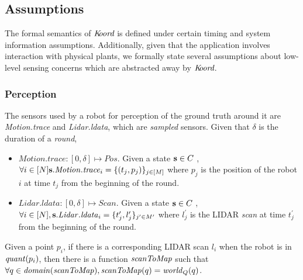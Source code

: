\subsection{Assumptions}
\label{sec:formal:sensing}

The formal semantics of $\emph{K\kern-2pt oord}$ is defined under certain timing and system information assumptions. Additionally, given that the application involves interaction with physical plants, we formally state several assumptions about low-level sensing concerns which are abstracted away by $\emph{K\kern-2pt oord}$.

\subsubsection{Perception}





The sensors used by a robot for perception of the ground truth around it are \emph{Motion.trace} and \emph{Lidar.ldata}, which are \emph{sampled} sensors. Given that $\delta$ is the duration of a \emph{round},

\begin{itemize}
    \item $\mathit{Motion.trace}: [0,\delta] \mapsto \mathit{Pos}$. Given a state ${\textbf{s}}\in C$ ,  $\forall i \in [N]{\textbf{s}}.\mathit{Motion.trace}_i = \{(t_j, p_j)\}_{j \in [M]}$ where $p_j$ is the position of the robot $i$ at time $t_j$ from the beginning of the round.
    \item  $\mathit{Lidar.ldata} : [0,\delta]\mapsto \mathit{Scan}$. Given a state ${\textbf{s}}\in C$ , $\forall i \in [N], {\textbf{s}}.\mathit{Lidar.ldata}_i = \{t_j^\prime, l_j^\prime\}_{j^\prime \in M^\prime}$ where $l_j^\prime$ is the LIDAR \emph{scan} at time $t_j^\prime$ from the beginning of the round.
\end{itemize}

\begin{assumption}
    \label{maptoscan}
    Given a point $p_i$, if there is a corresponding LIDAR scan $l_i$ when the robot is in $\mathit{quant}(p_i)$, then there is a function $\mathit{scanToMap}$ such that $\forall q \in \mathit{domain}(\mathit{scanToMap}), \mathit{scanToMap}(q) = \mathit{world}_Q(q)$.
\end{assumption}

